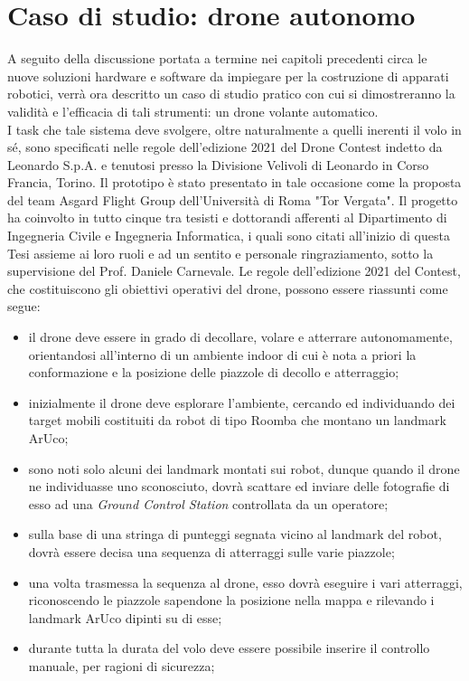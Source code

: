 
\chapter[Caso di studio: drone autonomo]{Caso di studio: drone autonomo}
\label{chap:Chapter3}
\doublespacing
\fontsize{14}{14}\selectfont
\indent A seguito della discussione portata a termine nei capitoli precedenti circa le nuove soluzioni hardware e software da impiegare per la costruzione di apparati robotici, verrà ora descritto un caso di studio pratico con cui si dimostreranno la validità e l'efficacia di tali strumenti: un drone volante automatico.\\
I task che tale sistema deve svolgere, oltre naturalmente a quelli inerenti il volo in sé, sono specificati nelle regole dell'edizione 2021 del Drone Contest indetto da Leonardo S.p.A. e tenutosi presso la Divisione Velivoli di Leonardo in Corso Francia, Torino. Il prototipo è stato presentato in tale occasione come la proposta del team Asgard Flight Group dell'Università di Roma "Tor Vergata". Il progetto ha coinvolto in tutto cinque tra tesisti e dottorandi afferenti al Dipartimento di Ingegneria Civile e Ingegneria Informatica, i quali sono citati all'inizio di questa Tesi assieme ai loro ruoli e ad un sentito e personale ringraziamento, sotto la supervisione del Prof. Daniele Carnevale. Le regole dell'edizione 2021 del Contest, che costituiscono gli obiettivi operativi del drone, possono essere riassunti come segue:
\begin{itemize}
    \item il drone deve essere in grado di decollare, volare e atterrare autonomamente, orientandosi all'interno di un ambiente indoor di cui è nota a priori la conformazione e la posizione delle piazzole di decollo e atterraggio;
    \item inizialmente il drone deve esplorare l'ambiente, cercando ed individuando dei target mobili costituiti da robot di tipo Roomba che montano un landmark ArUco;
    \item sono noti solo alcuni dei landmark montati sui robot, dunque quando il drone ne individuasse uno sconosciuto, dovrà scattare ed inviare delle fotografie di esso ad una \emph{Ground Control Station} controllata da un operatore;
    \item sulla base di una stringa di punteggi segnata vicino al landmark del robot, dovrà essere decisa una sequenza di atterraggi sulle varie piazzole;
    \item una volta trasmessa la sequenza al drone, esso dovrà eseguire i vari atterraggi, riconoscendo le piazzole sapendone la posizione nella mappa e rilevando i landmark ArUco dipinti su di esse;
    \item durante tutta la durata del volo deve essere possibile inserire il controllo manuale, per ragioni di sicurezza;
\end{itemize}

